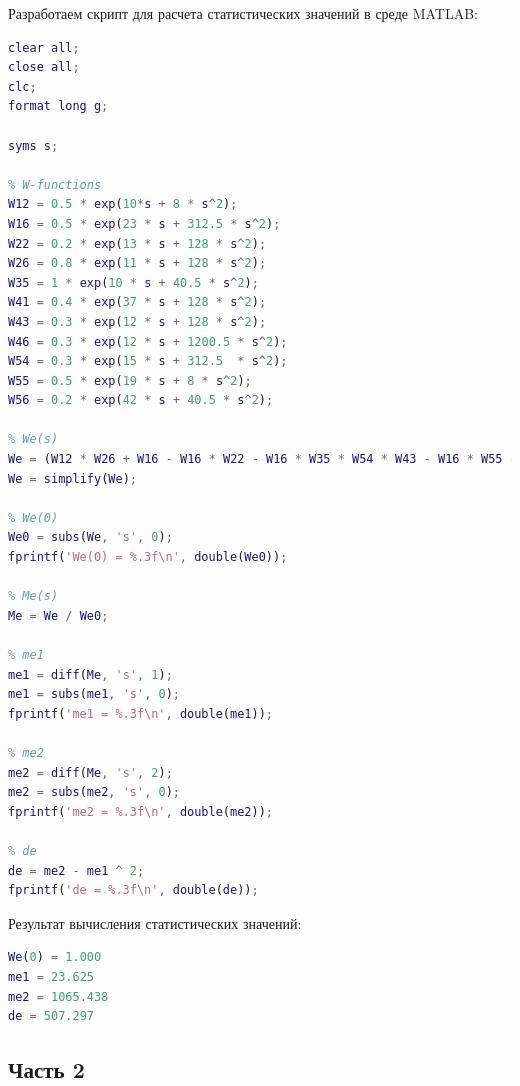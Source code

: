 \documentclass[14pt,a4paper,report]{report}
\begin{document}
Разработаем скрипт для расчета статистических значений в среде MATLAB:
\begin{lstlisting}[language={matlab}, caption={Matlab скрипт}, basicstyle=\ttfamily]
clear all;
close all; 
clc;
format long g;

syms s;

% W-functions
W12 = 0.5 * exp(10*s + 8 * s^2);
W16 = 0.5 * exp(23 * s + 312.5 * s^2);
W22 = 0.2 * exp(13 * s + 128 * s^2);
W26 = 0.8 * exp(11 * s + 128 * s^2);
W35 = 1 * exp(10 * s + 40.5 * s^2);
W41 = 0.4 * exp(37 * s + 128 * s^2);
W43 = 0.3 * exp(12 * s + 128 * s^2);
W46 = 0.3 * exp(12 * s + 1200.5 * s^2);
W54 = 0.3 * exp(15 * s + 312.5  * s^2);
W55 = 0.5 * exp(19 * s + 8 * s^2);
W56 = 0.2 * exp(42 * s + 40.5 * s^2);

% We(s)
We = (W12 * W26 + W16 - W16 * W22 - W16 * W35 * W54 * W43 - W16 * W55 - W12 * W26 * W55 - W12 * W26 * W35 * W54 * W43 + W16 * W22 * W35 * W54 * W43 + W16 * W22 * W55) / (1 - W35 * W54 * W43 - W22 - W55 + W22 * W55 + W22 * W35 * W54 * W43);
We = simplify(We);

% We(0)
We0 = subs(We, 's', 0);
fprintf('We(0) = %.3f\n', double(We0));

% Me(s)
Me = We / We0;

% me1
me1 = diff(Me, 's', 1);
me1 = subs(me1, 's', 0);
fprintf('me1 = %.3f\n', double(me1));

% me2
me2 = diff(Me, 's', 2);
me2 = subs(me2, 's', 0);
fprintf('me2 = %.3f\n', double(me2));

% de
de = me2 - me1 ^ 2;
fprintf('de = %.3f\n', double(de));

\end{lstlisting}


Результат вычисления статистических значений:

\begin{lstlisting}[language={matlab}, caption={Matlab скрипт}, basicstyle=\ttfamily]
We(0) = 1.000
me1 = 23.625
me2 = 1065.438
de = 507.297
\end{lstlisting}


\subsection{Часть 2}
\end{document}
